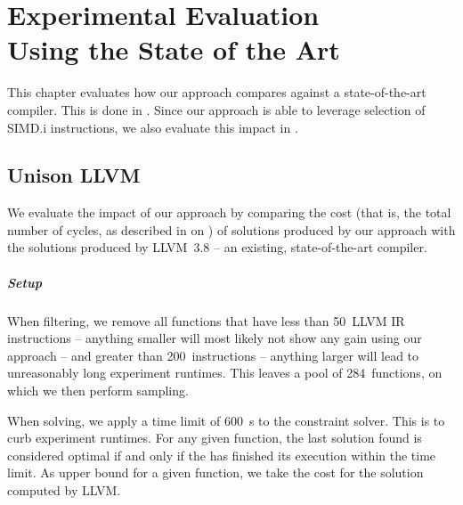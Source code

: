 %

\chapter[Experimental Evaluation Using the State of the Art]%
        {Experimental Evaluation\\ Using the State of the Art}

This chapter evaluates how our approach compares against a state-of-the-art
\gls{compiler}.
%
This is done in .
%
Since our approach is able to leverage selection of \gls{SIMD.i}
\glspl{instruction}, we also evaluate this impact in
.


\section{Unison \versus LLVM}

We evaluate the impact of our approach by comparing the cost (that is, the total
number of cycles, as described in  on
) of \glspl{solution} produced by our
approach with the \glspl{solution} produced by \mbox{\gls{LLVM} 3.8} -- an
existing, state-of-the-art \gls{compiler}.


\paragraph{Setup}

When filtering, we remove all \glspl{function} that have less than
\num{50}~\gls{LLVM} \gls{IR} \glspl{instruction} -- anything smaller will most
likely not show any gain using our approach -- and greater than
\num{200}~\glspl{instruction} -- anything larger will lead to unreasonably long
experiment runtimes.
%
This leaves a pool of \num{284}~\glspl{function}, on which we then perform
sampling.

When solving, we apply a time limit of \SI{600}{\s} to the \gls{constraint
  solver}.
%
This is to curb experiment runtimes.
%
For any given \gls{function}, the last \gls{solution} found is considered
optimal if and only if the  has finished its
execution within the time limit.
%
As upper bound for a given \gls{function}, we take the cost for the
\gls{solution} computed by \gls{LLVM}.


